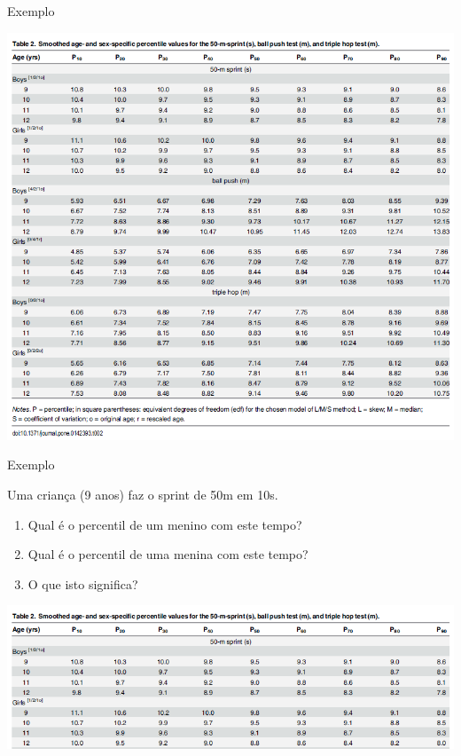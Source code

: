 \documentclass{beamer}
\begin{document}
\begin{frame}{\scriptsize Exemplo}
  \begin{center}
    \includegraphics[height=\textheight]{Cap3/percentil1}
  \end{center}
\end{frame}

\begin{frame}{\scriptsize Exemplo}
  \begin{exampleblock}{}
    \footnotesize
    Uma criança (9 anos) faz o sprint de 50m em 10s.

    \begin{enumerate}
      \footnotesize
    \item Qual é o percentil de um menino com este tempo?
    \item Qual é o percentil de uma menina com este tempo?
    \item O que isto significa?
    \end{enumerate}
  \end{exampleblock}
  \begin{center}
    \includegraphics[width=1.2\textwidth]{Cap3/percentil2}
  \end{center}
\end{frame}
\end{document}
